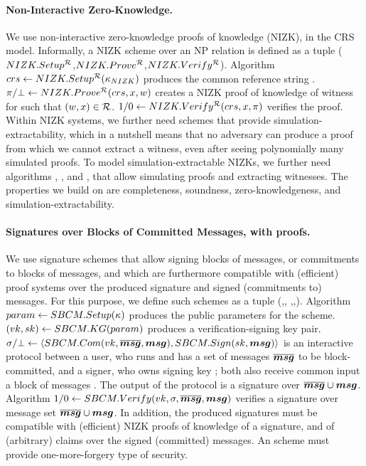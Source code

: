 \paragraph{Non-Interactive Zero-Knowledge.} %
We use non-interactive zero-knowledge proofs of knowledge (NIZK), in the CRS
model. Informally, a NIZK scheme over an NP relation \NIZKRel is defined as a
tuple ($NIZK.Setup^{\mathcal{R}}$,$NIZK.Prove^{\mathcal{R}}$,$NIZK.Verify^\mathcal{R}$).
Algorithm $crs \gets NIZK.Setup^{\mathcal{R}}(\kappa_{NIZK})$ produces the common
reference string \NIZKcrs. $\pi/\bot \gets NIZK.Prove^{\mathcal{R}}(crs,
x,w)$ creates a NIZK proof of knowledge of witness \NIZKw for \NIZKx
such that $(w,x) \in \mathcal{R}$. $1/0 \gets NIZK.Verify^{\mathcal{R}}
(crs,x,\pi)$ verifies the proof. Within NIZK systems, we
further need schemes that provide simulation-extractability, which in a nutshell
means that no adversary can produce a proof from which we cannot extract a
witness, even after seeing polynomially many simulated proofs. To model
simulation-extractable NIZKs, we further need algorithms \NIZKSimSetup,
\NIZKSim, and \NIZKExtract, that allow simulating proofs and extracting
witnesses. The properties we build on are completeness, soundness,
zero-knowledgeness, and simulation-extractability.

\paragraph{Signatures over Blocks of Committed Messages, with proofs.} %
We use signature schemes that allow signing blocks of messages, or commitments
to blocks of messages, and which are furthermore compatible with (efficient)
proof systems over the produced signature and signed (commitments to) messages.
For this purpose, we define such schemes as a tuple (\SBCMSetup,\SBCMKeyGen,
\SBCMCom,\SBCMSign,\SBCMVerify). Algorithm $param \gets SBCM.Setup(\kappa)$
produces the public parameters for the scheme. %
$(vk,sk) \gets SBCM.KG(param)$ produces a verification-signing
key pair. $\sigma/\bot \gets\langle SBCM.Com(vk,\overline{\boldsymbol{msg}},\boldsymbol{msg}),
  SBCM.Sign(sk,\boldsymbol{msg}) \rangle$ is an interactive protocol between a user, who
runs \SBCMCom and has a set of messages $\overline{\boldsymbol{msg}}$ to be block-committed,
and a signer, who owns signing key \sk; both also receive common input a
block of messages \smsg. The output of the protocol is a signature over
$\overline{\boldsymbol{msg}} \cup \boldsymbol{msg}$. Algorithm $1/0 \gets SBCM.Verify(vk,
\sigma,\overline{\boldsymbol{msg}},\boldsymbol{msg})$ verifies a signature \sig over message set
$\overline{\boldsymbol{msg}} \cup \boldsymbol{msg}$. In addition, the
produced signatures must be compatible with (efficient) NIZK proofs of knowledge
of a signature, and of (arbitrary) claims over the signed (committed) messages.
An \SBCM scheme must provide one-more-forgery type of security.

